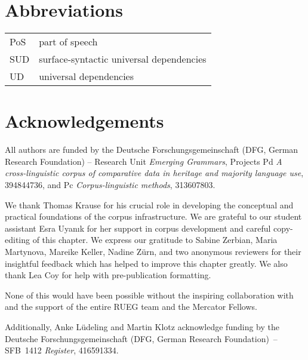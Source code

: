 \documentclass[output=paper,colorlinks,citecolor=brown]{langscibook}
\begin{document}
\section*{Abbreviations}
\begin{tabularx}{\textwidth}{@{}lQ@{}}
PoS & part of speech \\
SUD & surface-syntactic universal dependencies\\
UD & universal dependencies\\
\end{tabularx}

\section*{Acknowledgements}
All authors are funded by the Deutsche Forschungsgemeinschaft (DFG, German Research Foundation) -- Research Unit \textit{Emerging Grammars}, Projects Pd \textit{A cross-linguistic corpus of comparative data in heritage and majority language use}, 394844736, and Pc \textit{Corpus-linguistic methods}, 313607803.

We thank Thomas Krause for his crucial role in developing the conceptual and practical foundations of the corpus infrastructure. We are grateful to our student assistant Esra Uyanık for her support in corpus development and careful copy-editing of this chapter. We express our gratitude to Sabine Zerbian, Maria Martynova, Mareike Keller, Nadine Zürn, and two anonymous reviewers for their insightful feedback which has helped to improve this chapter greatly. We also thank Lea Coy for help with pre-publication formatting.

None of this would have been possible without the inspiring collaboration with and the support of the entire RUEG team and the Mercator Fellows.

Additionally, Anke Lüdeling and Martin Klotz acknowledge funding by the Deutsche Forschungsgemeinschaft (DFG, German Research Foundation)~– SFB~1412 \textit{Register}, 416591334.

{\sloppy\printbibliography[heading=subbibliography,notkeyword=this]}
\cleardoublepage
\end{document}
